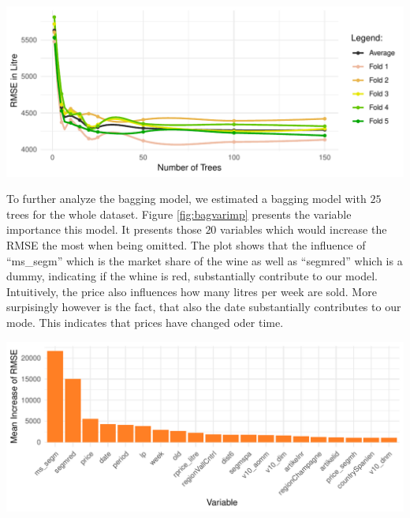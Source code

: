 \documentclass[11pt,]{article}
\let\origfigure\figure
\let\endorigfigure\endfigure
\renewenvironment{figure}[1][2] {
    \expandafter\origfigure\expandafter[H]
} {
    \endorigfigure
}
\begin{document}
\begin{figure}

\includegraphics{../00_data/output_paper/14_bagging} \hfill{}

\caption[Bagging: RMSE's at Different Tree Sizes]{\label{fig:rmsebag}Bagging: RMSE's at Different Tree Sizes (Smoothed).}\label{fig:bag}
\end{figure}

To further analyze the \ac{bagging} model, we estimated a \ac{bagging}
model with \(25\) trees for the whole dataset. Figure
\ref{fig:bagvarimp} presents the variable importance this model. It
presents those \(20\) variables which would increase the \ac{RMSE} the
most when being omitted. The plot shows that the influence of
\enquote{ms\_segm} which is the market share of the wine as well as
\enquote{segmred} which is a dummy, indicating if the whine is red,
substantially contribute to our model. Intuitively, the price also
influences how many litres per week are sold. More surpisingly however
is the fact, that also the date substantially contributes to our mode.
This indicates that prices have changed oder time.

\begin{figure}

\includegraphics{../00_data/output_paper/15_var_imp_bagging} \hfill{}

\caption{\label{fig:bagvarimp}Bagging: Variable Importance.}\label{fig:bag_varimp}
\end{figure}
\end{document}
